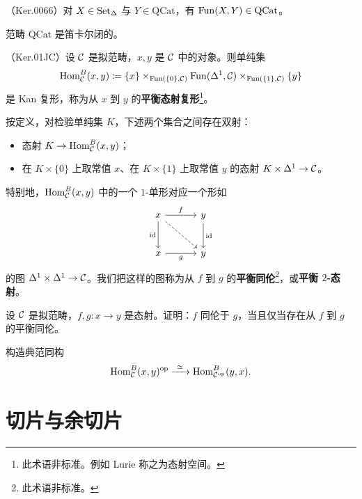 \begin{proposition}\label{L4-7.8}
（Ker.0066）对 $X\in\operatorname{Set}_\Delta$ 与 $Y\in\mathrm{QCat}$，有 $\operatorname{Fun}(X,Y)\in\mathrm{QCat}$。
\end{proposition}

\begin{corollary}\label{L4-7.9}
范畴 $\mathrm{QCat}$ 是笛卡尔闭的。
\end{corollary}

\begin{theoremdef}\label{L4-7.10}
（Ker.01JC）设 $\mathcal{C}$ 是拟范畴，$x,y$ 是 $\mathcal{C}$ 中的对象。则单纯集
\[
\operatorname{Hom}^{B}_{\mathcal{C}}(x,y)\coloneqq\{x\}\times_{\operatorname{Fun}(\{0\},\mathcal{C})}\operatorname{Fun}(\Delta^1,\mathcal{C})\times_{\operatorname{Fun}(\{1\},\mathcal{C})}\{y\}
\]
是 Kan 复形，称为从 $x$ 到 $y$ 的\textbf{平衡态射复形}\footnote{此术语非标准。例如 Lurie 称之为态射空间。}。
\end{theoremdef}

\nitem\label{L4-7.11} 按定义，对检验单纯集 $K$，下述两个集合之间存在双射：
\begin{itemize}[leftmargin=2.2em,itemsep=0.1em]
\item 态射 $K\to\operatorname{Hom}^{B}_{\mathcal{C}}(x,y)$；
\item 在 $K\times\{0\}$ 上取常值 $x$、在 $K\times\{1\}$ 上取常值 $y$ 的态射 $K\times\Delta^1\to\mathcal{C}$。
\end{itemize}

\nitem\label{L4-7.12} 特别地，$\operatorname{Hom}^{B}_{\mathcal{C}}(x,y)$ 中的一个 $1$-单形对应一个形如
\[
\begin{tikzcd}[column sep=3.2em,row sep=2.6em]
x \arrow[r, "f"] \arrow[d, "\id"'] \arrow[dr, dashed] & y \arrow[d, "\id"] \\
x \arrow[r, "g"'] & y
\end{tikzcd}
\]
的图 $\Delta^1\times\Delta^1\to\mathcal{C}$。我们把这样的图称为从 $f$ 到 $g$ 的\textbf{平衡同伦}\footnote{此术语非标准。}，或\textbf{平衡 $2$-态射}。

\begin{exercise}\label{L4-7.13}
设 $\mathcal{C}$ 是拟范畴，$f,g\colon x\to y$ 是态射。证明：$f$ 同伦于 $g$，当且仅当存在从 $f$ 到 $g$ 的平衡同伦。
\end{exercise}

\begin{exercise}\label{L4-7.14}
构造典范同构
\[
\Hom^{B}_{\cC}(x,y)^{\op}\xrightarrow{\ \simeq\ }\Hom^{B}_{\cC^{\op}}(y,x).
\]
\end{exercise}

\section{切片与余切片}

